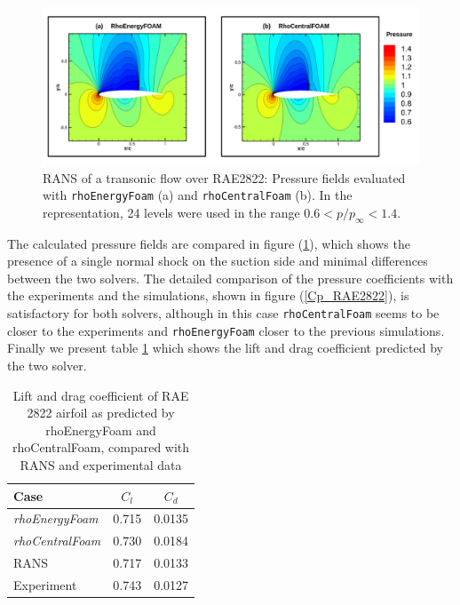 \documentclass[a5paper]{sapthesis}
\begin{document}
	\begin{figure}[h]
		\centering
		\includegraphics[width=1\textwidth]{Figures/RAE2822_pressurefield}
		\caption[Pressure field of a RANS of a transonic flow over RAE2822]{RANS of a transonic flow over RAE2822: Pressure fields evaluated with \texttt{rhoEnergyFoam} (a) and \texttt{rhoCentralFoam} (b). In the representation, 24 levels were used in the range  $0.6 < p/p_\infty < 1.4$.}
		\label{RAE2822_pressurefield}
	\end{figure}
	
	\noindent The calculated pressure fields are compared in figure (\ref{RAE2822_pressurefield}), which shows the presence of a single normal shock on the suction side and minimal differences between the two solvers. The detailed comparison of the pressure coefficients with the \citet{cook1977aerofoil} experiments and the \cite{slater2010rae2822} simulations, shown in figure (\ref{Cp_RAE2822}), is satisfactory for both solvers, although in this case \texttt{rhoCentralFoam} seems to be closer to the experiments and \texttt{rhoEnergyFoam} closer to the previous simulations. Finally we present table \ref{CLCDRAE2822} which shows the lift and
	drag coefficient predicted by the two solver.
	
	\begin{table}[h]
		\centering
		\begin{tabular}{lcc}
			\hline
			\textbf{Case} & $C_l$ & $C_d$ \\
			\hline
			\textit{rhoEnergyFoam}              & 0.715 & 0.0135 \\
			\textit{rhoCentralFoam}             & 0.730 & 0.0184 \\
			RANS \citep{coakley1987numerical}   & 0.717 & 0.0133 \\
			Experiment \citep{cook1977aerofoil} & 0.743 & 0.0127 \\
			\hline
		\end{tabular}
		\vspace{3mm}
		\caption[Lift and drag coeﬃcient of RAE 2822 airfoil]{Lift and drag coeﬃcient of RAE 2822 airfoil as predicted by rhoEnergyFoam and rhoCentralFoam, compared with \citet{coakley1987numerical} RANS and experimental data}
		\label{CLCDRAE2822}
	\end{table}
	
\end{document}
